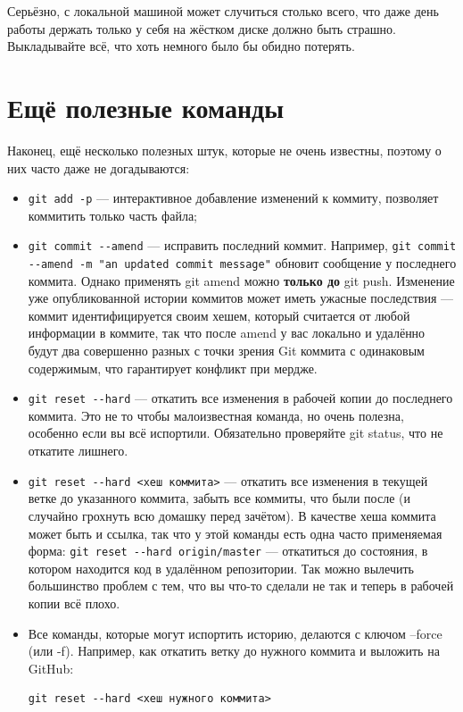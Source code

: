 \documentclass{../text-style}
\begin{document}
Серьёзно, с локальной машиной может случиться столько всего, что даже день работы держать только у себя на жёстком диске должно быть страшно. Выкладывайте всё, что хоть немного было бы обидно потерять.


\section{Ещё полезные команды}

Наконец, ещё несколько полезных штук, которые не очень известны, поэтому о них часто даже не догадываются:

\begin{itemize}
    \item \verb|git add -p| --- интерактивное добавление изменений к коммиту, позволяет коммитить только часть файла;
    \item \verb|git commit --amend| --- исправить последний коммит. Например, \verb|git commit --amend -m "an updated commit message"| обновит сообщение у последнего коммита. Однако применять git amend можно \textbf{только до} git push. Изменение уже опубликованной истории коммитов может иметь ужасные последствия --- коммит идентифицируется своим хешем, который считается от любой информации в коммите, так что после amend у вас локально и удалённо будут два совершенно разных с точки зрения Git коммита с одинаковым содержимым, что гарантирует конфликт при мердже.
    \item \verb|git reset --hard| --- откатить все изменения в рабочей копии до последнего коммита. Это не то чтобы малоизвестная команда, но очень полезна, особенно если вы всё испортили. Обязательно проверяйте git status, что не откатите лишнего.
    \item \verb|git reset --hard <хеш коммита>| --- откатить все изменения в текущей ветке до указанного коммита, забыть все коммиты, что были после (и случайно грохнуть всю домашку перед зачётом). В качестве хеша коммита может быть и ссылка, так что у этой команды есть одна часто применяемая форма: \verb|git reset --hard origin/master| --- откатиться до состояния, в котором находится код в удалённом репозитории. Так можно вылечить большинство проблем с тем, что вы что-то сделали не так и теперь в рабочей копии всё плохо.
    \item Все команды, которые могут испортить историю, делаются с ключом --force (или -f). Например, как откатить ветку до нужного коммита и выложить на GitHub:
        \begin{verbatim}
git reset --hard <хеш нужного коммита>

\end{verbatim}
\end{itemize}
\end{document}
